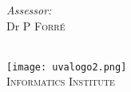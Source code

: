 \begin{titlepage}
\begin{minipage}[t]{0.4\textwidth}
    \begin{flushright} \large
    
    \emph{Assessor:} \\
    
    Dr P  \textsc{Forr\'{e}}\\
    
    \end{flushright}
    
    \end{minipage}\\[2cm]
    
    
    
    
    
    
    
    
    \texttt{[image: uvalogo2.png]}\\ %
    
    \textsc{\large Informatics Institute}\\[1.0cm] %
    
     
    
    
    
    
    \vfill %
    
    
    
    \end{titlepage}

    \restoregeometry